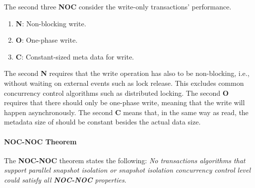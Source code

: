 The second three \textbf{NOC} consider the write-only transactions' performance.


\begin{enumerate}
    \item \textbf{N}: Non-blocking write.
    \item \textbf{O}: One-phase write.
    \item \textbf{C}: Constant-sized meta data for write.
\end{enumerate}


The second \textbf{N} requires that the write operation has also to be non-blocking, i.e., without waiting on external events such as lock release. This excludes common concurrency control algorithms such as distributed locking. The second \textbf{O} requires that there should only be one-phase write, meaning that the write will happen asynchronously. The second \textbf{C} means that, in the same way as read, the metadata size of should be constant besides the actual data size.



\paragraph{NOC-NOC Theorem} 
The \textbf{NOC-NOC} theorem states the following: \textit{No transactions algorithms that support parallel snapshot isolation or snapshot isolation concurrency control level could satisfy all \textbf{NOC-NOC} properties}.

